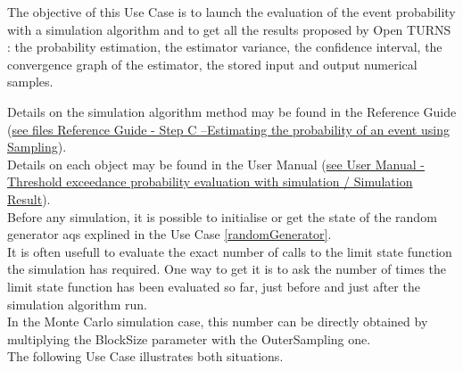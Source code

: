 \renewcommand{\filename}{docUC_ThresholdExceedance_SimulationAlgoExploitation.tex}
\renewcommand{\filetitle}{UC : Run and results exploitation  of a simulation algorithm : probability estimation, estimator variance, confidence interval, convergence graph, stored samples}

\HeaderIIILevel


\label{simuRes}



The objective of this Use Case is to launch the evaluation of the event probability with a simulation algorithm and to get all the results proposed by Open TURNS : the probability estimation, the estimator variance, the confidence interval, the convergence graph of the estimator, the stored input and output numerical samples.





Details on the simulation algorithm method may be found in the Reference Guide (\href{OpenTURNS_ReferenceGuide.pdf}{see files Reference Guide - Step C --Estimating the probability of an event using Sampling}).\\

Details on each object may be found in the User Manual  (\href{OpenTURNS_UserManual_TUI.pdf}{see User Manual - Threshold exceedance probability evaluation with simulation / Simulation Result}).\\

Before any simulation, it is possible to initialise or get the state of the random generator aqs explined in the Use Case \ref{randomGenerator}.\\

It is often usefull to evaluate the exact number of calls to the limit state function the simulation has required. One way to get it is to ask the number of times the limit state function has been evaluated so far, just before and just after the simulation algorithm run.\\
In the Monte Carlo simulation case, this number can be directly obtained by multiplying the BlockSize parameter with the OuterSampling one.\\
The following Use Case illustrates both situations.\\

